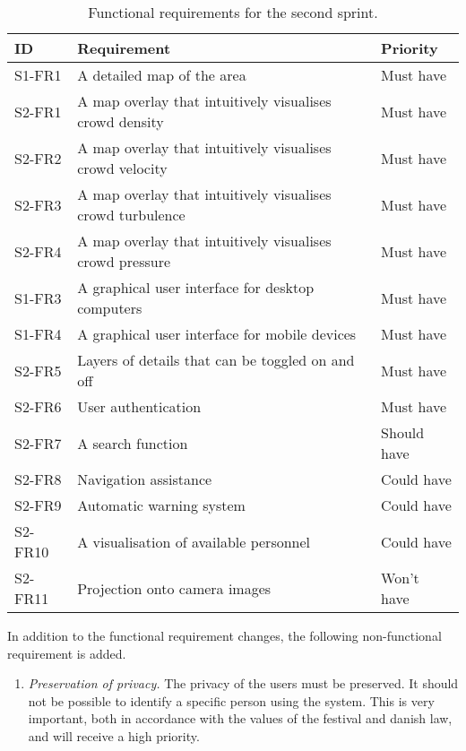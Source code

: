 \begin{table}[htbp]
	\centering
	\begin{tabularx}{\textwidth}{lXl}
		\toprule
		\textbf{ID} & \textbf{Requirement} & \textbf{Priority} \\
		\midrule 
		\rowcolor[HTML]{EFEFEF} 
		S1-FR1 & A detailed map of the area & Must have \\
		S2-FR1 & A map overlay that intuitively visualises crowd density & Must have \\
		\rowcolor[HTML]{EFEFEF} 
		S2-FR2 & A map overlay that intuitively visualises crowd velocity & Must have \\
		S2-FR3 & A map overlay that intuitively visualises crowd turbulence & Must have \\
		\rowcolor[HTML]{EFEFEF} 
		S2-FR4 & A map overlay that intuitively visualises crowd pressure & Must have \\
		S1-FR3 & A graphical user interface for desktop computers & Must have \\
		\rowcolor[HTML]{EFEFEF} 
		S1-FR4 & A graphical user interface for mobile devices & Must have \\
		S2-FR5 & Layers of details that can be toggled on and off & Must have \\
		\rowcolor[HTML]{EFEFEF} 
		S2-FR6 & User authentication & Must have \\
		S2-FR7 & A search function & Should have \\
		\rowcolor[HTML]{EFEFEF} 
		S2-FR8 & Navigation assistance & Could have \\
		S2-FR9 & Automatic warning system & Could have \\
		\rowcolor[HTML]{EFEFEF} 
		S2-FR10 & A visualisation of available personnel & Could have \\
		S2-FR11 & Projection onto camera images & Won't have \\
		\bottomrule
	\end{tabularx}
	\caption{Functional requirements for the second sprint.}
	\label{tab:s2_req}
\end{table}

In addition to the functional requirement changes, the following non-functional requirement is added.

\begin{enumerate}
    \item \emph{Preservation of privacy.} The privacy of the users must be preserved. It should not be possible to identify a specific person using the system. This is very important, both in accordance with the values of the festival and danish law, and will receive a high priority.
\end{enumerate}

